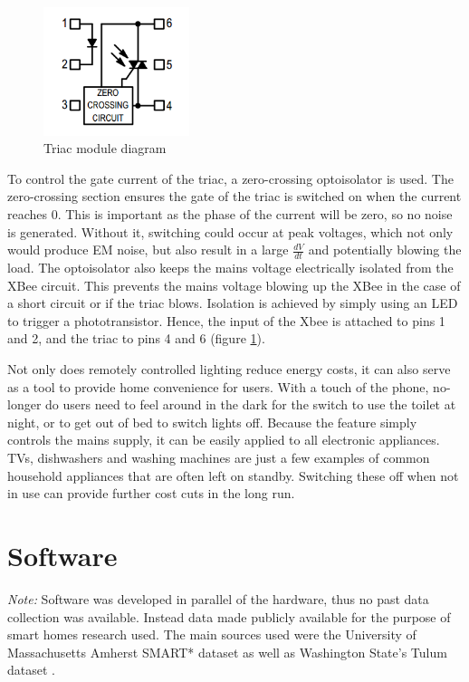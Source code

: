 \documentclass[10.5pt,a4paper,twoside]{report}   %
\begin{document}
\begin{figure}
  \vspace{-30pt}
  \begin{center}
    \includegraphics[width=0.38\textwidth]{images/triac_diag.png}
  \end{center}
  \vspace{-20pt}
  \caption{Triac module diagram}
\label{fig:triacmod}
  \vspace{-10pt}
\end{figure}

To control the gate current of the triac, a zero-crossing optoisolator is used. The zero-crossing section ensures the gate of the triac is switched on when the current reaches 0. This is important as the phase of the current will be zero, so no noise is generated. Without it, switching could occur at peak voltages, which not only would produce EM noise, but also result in a large $ \frac{dV}{dt}$ and potentially blowing the load. The optoisolator also keeps the mains voltage electrically isolated from the XBee circuit. This prevents the mains voltage blowing up the XBee in the case of a short circuit or if the triac blows. Isolation is achieved by simply using an LED to trigger a phototransistor. Hence, the input of the Xbee is attached to pins 1 and 2, and the triac to pins 4 and 6 (figure \ref{fig:triacmod}).

Not only does remotely controlled lighting reduce energy costs, it can also serve as a tool to provide home convenience for users. With a touch of the phone, no-longer do users need to feel around in the dark for the switch to use the toilet at night, or to get out of bed to switch lights off. Because the feature simply controls the mains supply, it can be easily applied to all electronic appliances. TVs, dishwashers and washing machines are just a few examples of common household appliances that are often left on standby. Switching these off when not in use can provide further cost cuts in the long run. 
\section{Software}     %
\textit{Note:} Software was developed in parallel of  the hardware, thus no past data collection was available. Instead data made publicly available for the purpose of smart homes research used. The main sources used were the University of Massachusetts Amherst SMART* dataset \cite{umasssmart} as well as Washington State's Tulum dataset \cite{tulumwsu}.
\end{document}
